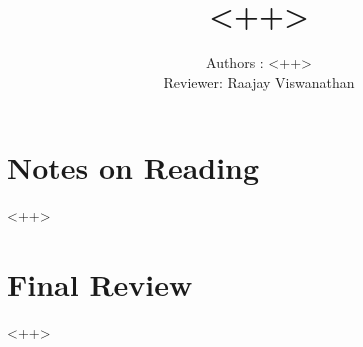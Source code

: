 \documentclass[a4paper,10pt]{article}
\title{<++>}
\author{Authors : <++> \\ Reviewer: Raajay Viswanathan}
\begin{document}
\maketitle
\section*{Notes on Reading}
<++>
\section*{Final Review}
<++>
\end{document}
